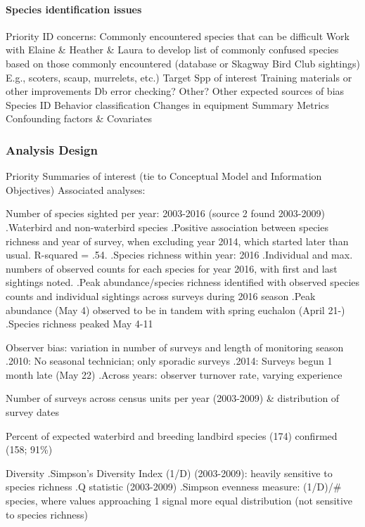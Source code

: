 \documentclass[]{article}
\let\oldparagraph\paragraph
\renewcommand{\paragraph}[1]{\oldparagraph{#1}\mbox{}}
\begin{document}
\paragraph{Species identification
issues}\label{species-identification-issues}

Priority ID concerns: Commonly encountered species that can be difficult
Work with Elaine \& Heather \& Laura to develop list of commonly
confused species based on those commonly encountered (database or
Skagway Bird Club sightings) E.g., scoters, scaup, murrelets, etc.)
Target Spp of interest Training materials or other improvements Db error
checking? Other? Other expected sources of bias Species ID Behavior
classification Changes in equipment Summary Metrics Confounding factors
\& Covariates

\subsubsection{Analysis Design}\label{analysis-design}

Priority Summaries of interest (tie to Conceptual Model and Information
Objectives) Associated analyses:

Number of species sighted per year: 2003-2016 (source 2 found 2003-2009)
.Waterbird and non-waterbird species .Positive association between
species richness and year of survey, when excluding year 2014, which
started later than usual. R-squared = .54. .Species richness within
year: 2016 .Individual and max. numbers of observed counts for each
species for year 2016, with first and last sightings noted. .Peak
abundance/species richness identified with observed species counts and
individual sightings across surveys during 2016 season .Peak abundance
(May 4) observed to be in tandem with spring euchalon (April 21-)
.Species richness peaked May 4-11

Observer bias: variation in number of surveys and length of monitoring
season .2010: No seasonal technician; only sporadic surveys .2014:
Surveys begun 1 month late (May 22) .Across years: observer turnover
rate, varying experience

Number of surveys across census units per year (2003-2009) \&
distribution of survey dates

Percent of expected waterbird and breeding landbird species (174)
confirmed (158; 91\%)

Diversity .Simpson's Diversity Index (1/D) (2003-2009): heavily
sensitive to species richness .Q statistic (2003-2009) .Simpson evenness
measure: (1/D)/\# species, where values approaching 1 signal more equal
distribution (not sensitive to species richness)
\end{document}
